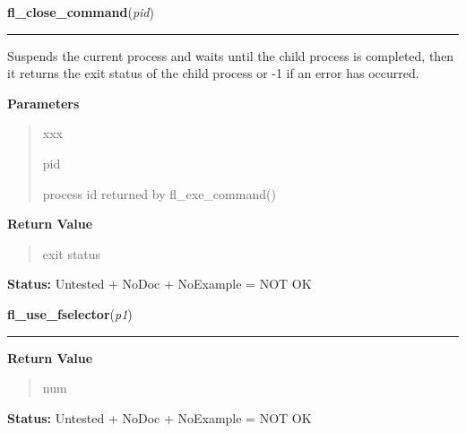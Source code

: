 \hspace{.8\funcindent}\begin{boxedminipage}{\funcwidth}

    \raggedright \textbf{fl\_close\_command}(\textit{pid})

    \vspace{-1.5ex}

    \rule{\textwidth}{0.5\fboxrule}
\setlength{\parskip}{2ex}
    Suspends the current process and waits until the child process is 
    completed, then it returns the exit status of the child process or -1 
    if an error has occurred.

\setlength{\parskip}{1ex}
      \textbf{Parameters}
      \vspace{-1ex}

      \begin{quote}
        \begin{Ventry}{xxx}

          \item[pid]

          process id returned by fl\_exe\_command()

        \end{Ventry}

      \end{quote}

      \textbf{Return Value}
    \vspace{-1ex}

      \begin{quote}
      exit status

      \end{quote}

\textbf{Status:} Untested + NoDoc + NoExample = NOT OK



    \end{boxedminipage}

    \label{xformslib:library:fl_use_fselector}

    \vspace{0.5ex}

\hspace{.8\funcindent}\begin{boxedminipage}{\funcwidth}

    \raggedright \textbf{fl\_use\_fselector}(\textit{p1})

    \vspace{-1.5ex}

    \rule{\textwidth}{0.5\fboxrule}
\setlength{\parskip}{2ex}
\setlength{\parskip}{1ex}
      \textbf{Return Value}
    \vspace{-1ex}

      \begin{quote}
      num

      \end{quote}

\textbf{Status:} Untested + NoDoc + NoExample = NOT OK



    \end{boxedminipage}

